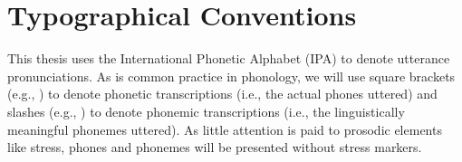 \renewcommand\contentsname{Table of Contents}
\tableofcontents
\cleardoublepage
{}

\listoftables
\cleardoublepage
{}

\listoffigures
\cleardoublepage
{}


\chapter*{Typographical Conventions}
\label{typography}

This thesis uses the International Phonetic Alphabet (IPA)
to denote utterance pronunciations.
As is common practice in phonology,
we will use square brackets (e.g., \ipa{[$\cdot$]})
to denote phonetic transcriptions
(i.e., the actual phones uttered)
and slashes (e.g., \ipa{/$\cdot$/})
to denote phonemic transcriptions
(i.e., the linguistically meaningful
phonemes uttered).
As little attention is paid to prosodic elements like stress,
phones and phonemes will be presented
without stress markers.

\cleardoublepage
{}

